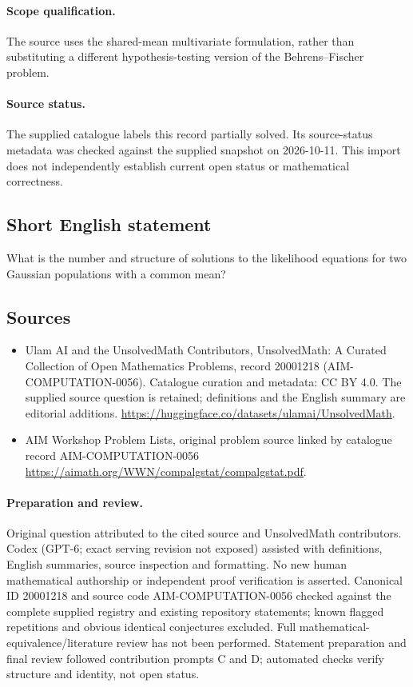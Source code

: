 \documentclass[11pt]{article}
\begin{document}
\paragraph{Scope qualification.}
The source uses the shared-mean multivariate formulation, rather than substituting a different hypothesis-testing version of the Behrens--Fischer problem.
\paragraph{Source status.}
The supplied catalogue labels this record partially solved. Its source-status metadata was checked against the supplied snapshot on 2026-10-11. This import does not independently establish current open status or mathematical correctness.
\subsection{Short English statement}
What is the number and structure of solutions to the likelihood equations for two Gaussian populations with a common mean?
\subsection{Sources}
\begin{itemize}
\item[S1] Ulam AI and the UnsolvedMath Contributors, UnsolvedMath: A Curated Collection of Open Mathematics Problems, record 20001218 (AIM-COMPUTATION-0056). Catalogue curation and metadata: CC BY 4.0. The supplied source question is retained; definitions and the English summary are editorial additions.
\url{https://huggingface.co/datasets/ulamai/UnsolvedMath}.
\item[S2] AIM Workshop Problem Lists, original problem source linked by catalogue record AIM-COMPUTATION-0056
\url{https://aimath.org/WWN/compalgstat/compalgstat.pdf}.
\end{itemize}
\paragraph{Preparation and review.}
Original question attributed to the cited source and UnsolvedMath contributors. Codex (GPT-6; exact serving revision not exposed) assisted with definitions, English summaries, source inspection and formatting. No new human mathematical authorship or independent proof verification is asserted. Canonical ID 20001218 and source code AIM-COMPUTATION-0056 checked against the complete supplied registry and existing repository statements; known flagged repetitions and obvious identical conjectures excluded. Full mathematical-equivalence/literature review has not been performed. Statement preparation and final review followed contribution prompts C and D; automated checks verify structure and identity, not open status.
\label{end:20001218}
\end{document}
